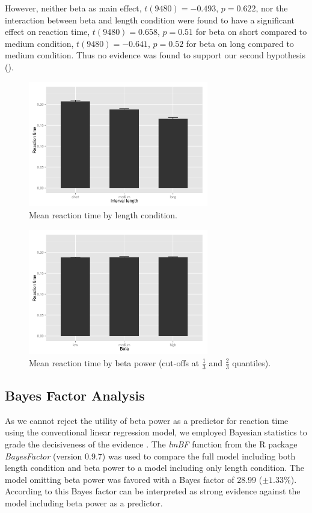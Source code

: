 \documentclass[man,floatsintext]{apa6} %
\begin{document}
However, neither beta as main effect, $t(9480) = -0.493$, $p = 0.622$, nor the interaction between beta and length condition were found to have a significant effect on reaction time, $t(9480) = 0.658$, $p = 0.51$ for beta on short compared to medium condition, $t(9480) = -0.641$, $p = 0.52$ for beta on long compared to medium condition. Thus no evidence was found to support our second hypothesis ().

\begin{figure}[!ht]
  \includegraphics[width=0.7\textwidth]{actual_rt_by_length}
  \caption{Mean reaction time by length condition.}
  \label{fig:rt_by_length}
\end{figure}

\begin{figure}[!ht]
  \includegraphics[width=0.7\textwidth]{actual_rt_by_beta}
  \caption{Mean reaction time by beta power (cut-offs at $\frac{1}{3}$ and $\frac{2}{3}$ quantiles).}
  \label{fig:rt_by_beta}
\end{figure}

\subsection{Bayes Factor Analysis}
As we cannot reject the utility of beta power as a predictor for reaction time using the conventional linear regression model, we employed Bayesian statistics to grade the decisiveness of the evidence \cite{jeffreys_theory_1961}. The \emph{lmBF} function from the R package \emph{BayesFactor} (version 0.9.7) was used to compare the full model including both length condition and beta power to a model including only length condition. The model omitting beta power was favored with a Bayes factor of 28.99 ($\pm 1.33\%$). According to  this Bayes factor can be interpreted as strong evidence against the model including beta power as a predictor.
\end{document}
